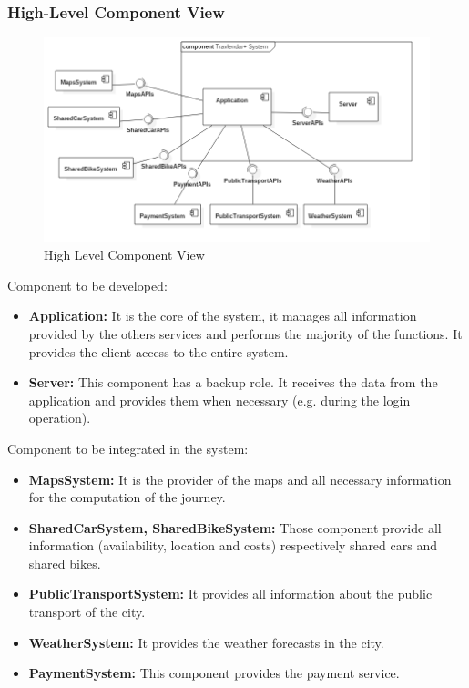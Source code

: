 \subsubsection{High-Level Component View}
\begin{figure}[!h]
\centering
\includegraphics[scale=0.4]{images/ComponentDiagramSystem}
\caption{High Level Component View}
\label{ref:highlevelcomponentview}
\end{figure}
Component to be developed:
\begin{itemize}
\item
\textbf{Application:} It is the core of the system, it manages all information provided by the others services and performs the majority of the functions. It provides the client access to the entire system.
\item
\textbf{Server:} This component has a backup role. It receives the data from the application and provides them when necessary (e.g. during the login operation).
\end{itemize}
Component to be integrated in the system:
\begin{itemize}
\item
\textbf{MapsSystem:} It is the provider of the maps and all necessary information for the computation of the journey.
\item
\textbf{SharedCarSystem, SharedBikeSystem:} Those component provide all information (availability, location and costs) respectively shared cars and shared bikes.
\item
\textbf{PublicTransportSystem:} It provides all information about the public transport of the city.
\item
\textbf{WeatherSystem:} It provides the weather forecasts in the city.
\item
\textbf{PaymentSystem:} This component provides the payment service.
\end{itemize}

